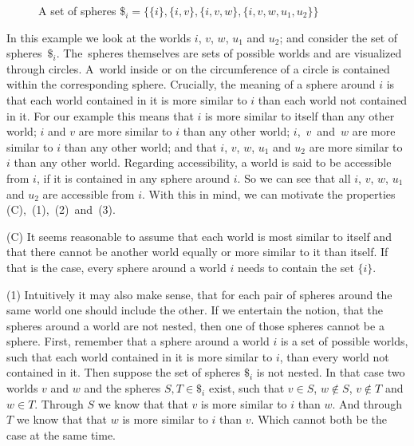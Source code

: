 \documentclass[a4paper,american,10pt]{paper}
\theoremstyle{definition}\newtheorem{lemma}[thm]{Lemma}
\theoremstyle{definition}\newtheorem{proposition}[thm]{Proposition}
\theoremstyle{definition}\newtheorem{corollary}[thm]{Corollary}
\theoremstyle{definition}\newtheorem{definition}{Definition}
\begin{document}
\begin{figure}[H]
\centering
{}
\caption{A set of spheres $\$_i=\{\{ i\} ,\{ i,v\} ,\{ i,v,w\}, \{ i,v,w, u_1, u_2\}\}$}
\label{fig:set_of_spheres}
\end{figure}

\noindent In this example we look at the worlds $i$, $v$, $w$, $u_1$ and $u_2$; and consider the set of spheres~$\$_i$. The~spheres themselves are sets of possible worlds and are visualized through circles. A~world inside or on the circumference of a circle is contained within the corresponding sphere. Crucially, the meaning of a sphere around $i$ is that each world contained in it is more similar to $i$ than each world not contained in it. For our example this means that $i$ is more similar to itself than any other world; $i$ and $v$ are more similar to $i$ than any other world; $i$,~$v$~and~$w$ are more similar to $i$ than any other world; and that $i$, $v$, $w$, $u_1$ and $u_2$ are more similar to $i$ than any other world. Regarding accessibility, a world is said to be accessible from $i$, if it is contained in any sphere around $i$. So we can see that all $i$, $v$, $w$, $u_1$ and $u_2$ are accessible from $i$. With this in mind, we can motivate the properties (C),~(1),~(2)~and~(3).

(C) It seems reasonable to assume that each world is most similar to itself and that there cannot be another world equally or more similar to it than itself. If that is the case, every sphere around a world $i$ needs to contain the set $\{ i\}$.

(1) Intuitively it may also make sense, that for each pair of spheres around the same world one should include the other. If we entertain the notion, that the spheres around a world are not nested, then one of those spheres cannot be a sphere. First, remember that a sphere around a world $i$ is a set of possible worlds, such that each world contained in it is more similar to $i$, than every world not contained in it. Then suppose the set of spheres $\$_i$ is not nested. In that case two worlds $v$ and $w$ and the spheres $S,T\in\$_i$ exist, such that $v\in S$, $w\notin S$, $v\notin T$ and $w\in T$. Through $S$ we know that that $v$ is more similar to $i$ than $w$. And through $T$ we know that that $w$ is more similar to $i$ than $v$. Which cannot both be the case at the same time.
\end{document}
